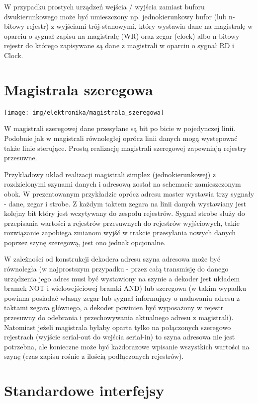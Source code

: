W przypadku prostych urządzeń wejścia / wyjścia zamiast buforu dwukierunkowego może być umieszczony np.
jednokierunkowy bufor (lub n-bitowy rejestr) z wyjściami trój-stanowymi, który wystawia dane na magistralę w oparciu o sygnał zapisu na magistralę (WR) oraz zegar (clock) albo
n-bitowy rejestr do którego zapisywane są dane z magistrali w oparciu o sygnał RD i Clock.

\section{Magistrala szeregowa}

\begin{center}
    \texttt{[image: img/elektronika/magistrala\_szeregowa]}
\end{center}
W magistrali szeregowej dane przesyłane są bit po bicie w pojedynczej linii. Podobnie jak w magistrali równoległej oprócz linii danych mogą występować także linie sterujące. Prostą realizację magistrali szeregowej zapewniają rejestry przesuwne.

Przykładowy układ realizacji magistrali simplex (jednokierunkowej) z rozdzielonymi szynami danych i adresową został na schemacie zamieszczonym obok.
W prezentowanym przykładzie oprócz adresu master wystawia trzy sygnały - dane, zegar i strobe. Z każdym taktem zegara na linii danych wystawiany jest kolejny bit który jest wczytywany do zespołu rejestrów. Sygnał strobe służy do przepisania wartości z rejestrów przesuwnych do rejestrów wyjściowych, takie rozwiązanie zapobiega zmianom wyjść w trakcie przesyłania nowych danych poprzez szynę szeregową, jest ono jednak opcjonalne.

W zależności od konstrukcji dekodera adresu szyna adresowa może być równoległa (w najprostszym przypadku - przez całą transmisję do danego urządzenia jego adres musi być wystawiony na szynie a dekoder jest układem bramek NOT i wielowejściowej bramki AND) lub szeregowa (w takim wypadku powinna posiadać własny zegar lub sygnał informujący o nadawaniu adresu z taktami zegara głównego, a dekoder powinien być wyposażony w rejestr przesuwny do odebrania i przechowywania aktualnego adresu z magistrali). Natomiast jeżeli magistrala byłaby oparta tylko na połączonych szeregowo rejestrach (wyjście serial-out do wejścia serial-in) to szyna adresowa nie jest potrzebna, ale konieczne może być każdorazowe wpisanie wszystkich wartości na szynę (czas zapisu rośnie z ilością podłączonych rejestrów).

\section{Standardowe interfejsy}

